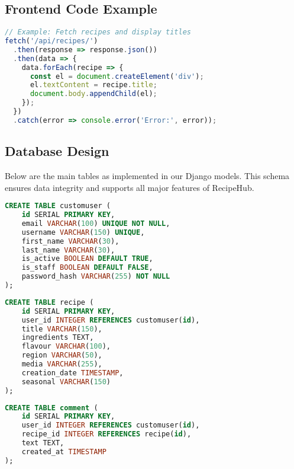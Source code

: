 \documentclass[conference]{IEEEtran}
\begin{document}
\subsection{Frontend Code Example}
\begin{lstlisting}[language=JavaScript, basicstyle=\scriptsize\ttfamily, caption={Sample Frontend Code: Fetch Recipes}]
// Example: Fetch recipes and display titles
fetch('/api/recipes/')
  .then(response => response.json())
  .then(data => {
    data.forEach(recipe => {
      const el = document.createElement('div');
      el.textContent = recipe.title;
      document.body.appendChild(el);
    });
  })
  .catch(error => console.error('Error:', error));
\end{lstlisting}

\subsection{Database Design}
Below are the main tables as implemented in our Django models. This schema ensures data integrity and supports all major features of RecipeHub.

\begin{lstlisting}[language=SQL, basicstyle=\scriptsize\ttfamily, caption={CustomUser Table}]
CREATE TABLE customuser (
    id SERIAL PRIMARY KEY,
    email VARCHAR(100) UNIQUE NOT NULL,
    username VARCHAR(150) UNIQUE,
    first_name VARCHAR(30),
    last_name VARCHAR(30),
    is_active BOOLEAN DEFAULT TRUE,
    is_staff BOOLEAN DEFAULT FALSE,
    password_hash VARCHAR(255) NOT NULL
);
\end{lstlisting}

\begin{lstlisting}[language=SQL, basicstyle=\scriptsize\ttfamily, caption={Recipe Table}]
CREATE TABLE recipe (
    id SERIAL PRIMARY KEY,
    user_id INTEGER REFERENCES customuser(id),
    title VARCHAR(150),
    ingredients TEXT,
    flavour VARCHAR(100),
    region VARCHAR(50),
    media VARCHAR(255),
    creation_date TIMESTAMP,
    seasonal VARCHAR(150)
);
\end{lstlisting}

\begin{lstlisting}[language=SQL, basicstyle=\scriptsize\ttfamily, caption={Comment Table}]
CREATE TABLE comment (
    id SERIAL PRIMARY KEY,
    user_id INTEGER REFERENCES customuser(id),
    recipe_id INTEGER REFERENCES recipe(id),
    text TEXT,
    created_at TIMESTAMP
);
\end{lstlisting}
\end{document}
